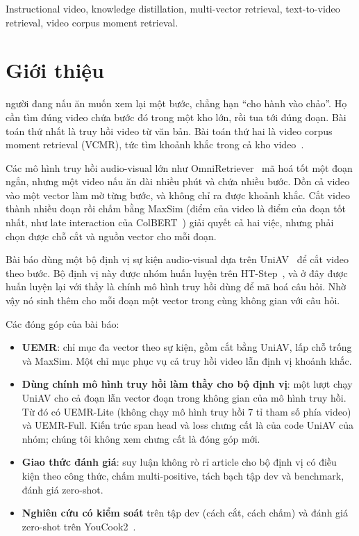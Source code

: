 \documentclass{IEEEtran}
\begin{document}
\begin{IEEEkeywords}
Instructional video, knowledge distillation, multi-vector retrieval, text-to-video retrieval, video corpus moment retrieval.
\end{IEEEkeywords}

\section{Giới thiệu}
\label{sec:introduction}
 người đang nấu ăn muốn xem lại một bước, chẳng hạn ``cho hành vào chảo''. Họ cần tìm đúng video chứa bước đó trong một kho lớn, rồi tua tới đúng đoạn. Bài toán thứ nhất là truy hồi video từ văn bản. Bài toán thứ hai là video corpus moment retrieval (VCMR), tức tìm khoảnh khắc trong cả kho video~\cite{tvr}.

Các mô hình truy hồi audio-visual lớn như OmniRetriever~\cite{omniretriever} mã hoá tốt một đoạn ngắn, nhưng một video nấu ăn dài nhiều phút và chứa nhiều bước. Dồn cả video vào một vector làm mờ từng bước, và không chỉ ra được khoảnh khắc. Cắt video thành nhiều đoạn rồi chấm bằng MaxSim (điểm của video là điểm của đoạn tốt nhất, như late interaction của ColBERT~\cite{colbert}) giải quyết cả hai việc, nhưng phải chọn được chỗ cắt và nguồn vector cho mỗi đoạn.

Bài báo dùng một bộ định vị sự kiện audio-visual dựa trên UniAV~\cite{uniav} để cắt video theo bước. Bộ định vị này được nhóm huấn luyện trên HT-Step~\cite{htstep}, và ở đây được huấn luyện lại với thầy là chính mô hình truy hồi dùng để mã hoá câu hỏi. Nhờ vậy nó sinh thêm cho mỗi đoạn một vector trong cùng không gian với câu hỏi.

Các đóng góp của bài báo:
\begin{itemize}
\item \textbf{UEMR}: chỉ mục đa vector theo sự kiện, gồm cắt bằng UniAV, lấp chỗ trống và MaxSim. Một chỉ mục phục vụ cả truy hồi video lẫn định vị khoảnh khắc.
\item \textbf{Dùng chính mô hình truy hồi làm thầy cho bộ định vị}: một lượt chạy UniAV cho cả đoạn lẫn vector đoạn trong không gian của mô hình truy hồi. Từ đó có UEMR-Lite (không chạy mô hình truy hồi 7 tỉ tham số phía video) và UEMR-Full. Kiến trúc span head và loss chưng cất là của code UniAV của nhóm; chúng tôi không xem chưng cất là đóng góp mới.
\item \textbf{Giao thức đánh giá}: suy luận không rò rỉ article cho bộ định vị có điều kiện theo công thức, chấm multi-positive, tách bạch tập dev và benchmark, đánh giá zero-shot.
\item \textbf{Nghiên cứu có kiểm soát} trên tập dev (cách cắt, cách chấm) và đánh giá zero-shot trên YouCook2~\cite{youcook2}.
\end{itemize}
\end{document}
